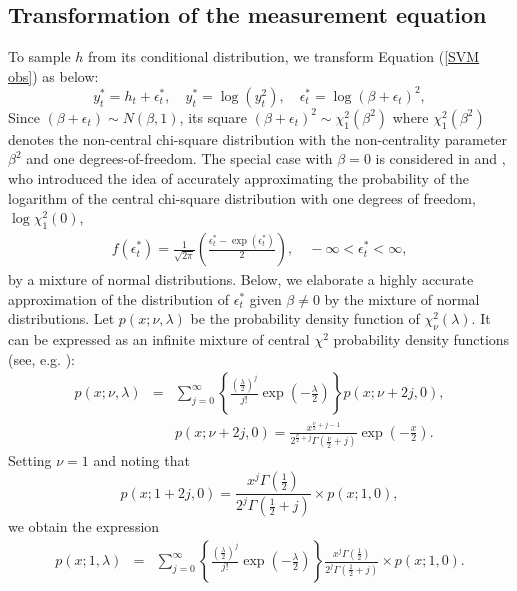 \subsection{Transformation of the measurement equation}
To sample $h$ from its conditional distribution, we transform Equation (\ref{SVM obs}) as below:
\begin{equation}
    y_t^* = h_t + \epsilon_t^*, \quad y_t^* = \log(y_t^2), \quad \epsilon_t^* = \log(\beta + \epsilon_t)^2,
    \label{transform}
\end{equation}
Since $(\beta + \epsilon_t) \sim N(\beta, 1)$, its square $(\beta + \epsilon_t)^2 \sim \chi_1^2(\beta^2)$ where $\chi_1^2(\beta^2)$ denotes the non-central chi-square distribution with the non-centrality parameter $\beta^2$ and one degrees-of-freedom.
The special case with $\beta=0$ is considered in \cite{KimShephardChib(98)} and \cite{OmoriChibShephardNakajima(07)}, 
who introduced the idea of accurately approximating the probability of the logarithm of the central chi-square distribution with one degrees of freedom, $\log \chi_1^2(0)$,
\begin{eqnarray*}
    f(\epsilon_t^*) = \frac{1}{\sqrt{2\pi}} \left( \frac{\epsilon_t^* - \exp(\epsilon_t^*)}{2} \right), \quad -\infty <\epsilon_t^* < \infty,
\end{eqnarray*}
by a mixture of normal distributions. Below, we elaborate a highly accurate approximation of the distribution of $\epsilon_t^*$ given $\beta \neq 0$ by the mixture of normal distributions. 
Let $p(x;\nu, \lambda)$ be the probability density function of $\chi_\nu^2(\lambda)$. 
It can be expressed as an infinite mixture of central $\chi^2$ probability density functions (see, e.g. \cite{JohnsonKotzBalakrishnan(95)}):
\begin{eqnarray*}
    p(x;\nu, \lambda) &=& \sum_{j=0}^{\infty} \left\{ \frac{\left(\frac{\lambda}{2}\right)^j}{j!} \exp\left(-\frac{\lambda}{2}\right) \right\} p(x;\nu+2j, 0),
    \label{chi2_pdf}
\\
    && p(x; \nu + 2j, 0) = \frac{x^{\frac{\nu}{2}+j-1}}{2^{\frac{\nu}{2}+j} \Gamma(\frac{\nu}{2}+j)} \exp\left(-\frac{x}{2}\right).
    \nonumber
\end{eqnarray*}
Setting  $\nu=1$ and noting that
\begin{equation*}
    p(x;1+2j, 0) = \frac{x^j \Gamma\left(\frac{1}{2}\right)}{2^j \Gamma\left(\frac{1}{2}+j\right)} \times p(x; 1, 0),
\end{equation*}
we obtain the expression
\begin{eqnarray}
    p(x;1,\lambda) &=& \sum_{j=0}^{\infty} \left\{ \frac{\left(\frac{\lambda}{2}\right)^j}{j!} \exp\left(-\frac{\lambda}{2}\right) \right\} 
    \label{chi2_pdf_df=1}
    \frac{x^j \Gamma\left(\frac{1}{2}\right)}{2^j \Gamma\left(\frac{1}{2}+j\right)} \times p(x; 1, 0).
\end{eqnarray}
